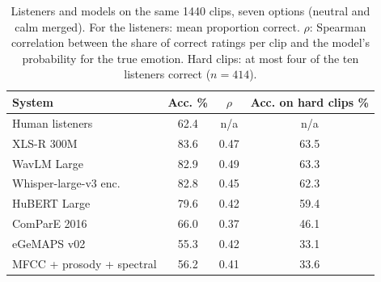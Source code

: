 \begin{table}[!t]
\centering
\caption{Listeners and models on the same 1440 clips, seven options (neutral and calm merged). For the listeners: mean proportion correct. $\rho$: Spearman correlation between the share of correct ratings per clip and the model's probability for the true emotion. Hard clips: at most four of the ten listeners correct ($n=414$).}
\label{tab:human}
\begin{tabular}{lccc}
\toprule
System & Acc. \% & $\rho$ & Acc. on hard clips \% \\
\midrule
Human listeners & 62.4 & n/a & n/a \\
XLS-R 300M & 83.6 & 0.47 & 63.5 \\
WavLM Large & 82.9 & 0.49 & 63.3 \\
Whisper-large-v3 enc. & 82.8 & 0.45 & 62.3 \\
HuBERT Large & 79.6 & 0.42 & 59.4 \\
ComParE 2016 & 66.0 & 0.37 & 46.1 \\
eGeMAPS v02 & 55.3 & 0.42 & 33.1 \\
MFCC + prosody + spectral & 56.2 & 0.41 & 33.6 \\
\bottomrule
\end{tabular}
\end{table}
